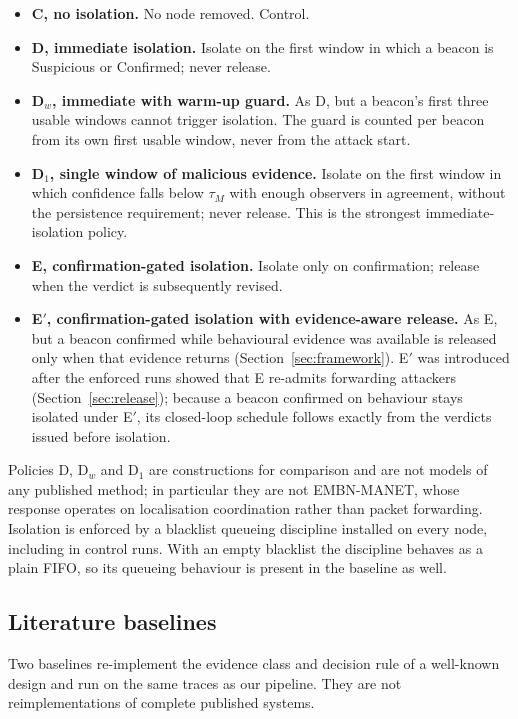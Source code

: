 \begin{itemize}
\item \textbf{C, no isolation.} No node removed. Control.
\item \textbf{D, immediate isolation.} Isolate on the first window in which a
      beacon is Suspicious or Confirmed; never release.
\item \textbf{D$_w$, immediate with warm-up guard.} As D, but a beacon's first
      three usable windows cannot trigger isolation. The guard is counted per
      beacon from its own first usable window, never from the attack start.
\item \textbf{D$_1$, single window of malicious evidence.} Isolate on the
      first window in which confidence falls below $\tau_M$ with enough
      observers in agreement, without the persistence requirement; never
      release. This is the strongest immediate-isolation policy.
\item \textbf{E, confirmation-gated isolation.} Isolate only on confirmation;
      release when the verdict is subsequently revised.
\item \textbf{E$'$, confirmation-gated isolation with evidence-aware
      release.} As E, but a beacon confirmed while behavioural evidence was
      available is released only when that evidence returns
      (Section~\ref{sec:framework}). E$'$ was introduced after the enforced
      runs showed that E re-admits forwarding attackers
      (Section~\ref{sec:release}); because a beacon confirmed on behaviour
      stays isolated under E$'$, its closed-loop schedule follows exactly
      from the verdicts issued before isolation.
\end{itemize}

Policies D, D$_w$ and D$_1$ are constructions for comparison and are not models
of any published method; in particular they are not EMBN-MANET, whose response
operates on localisation coordination rather than packet forwarding.
Isolation is enforced by a blacklist queueing discipline installed on every
node, including in control runs. With an empty blacklist the discipline
behaves as a plain FIFO, so its queueing behaviour is present in the baseline
as well.

\subsection{Literature baselines}
\label{sec:baselinedef}

Two baselines re-implement the evidence class and decision rule of a
well-known design and run on the same traces as our pipeline. They are not
reimplementations of complete published systems.

